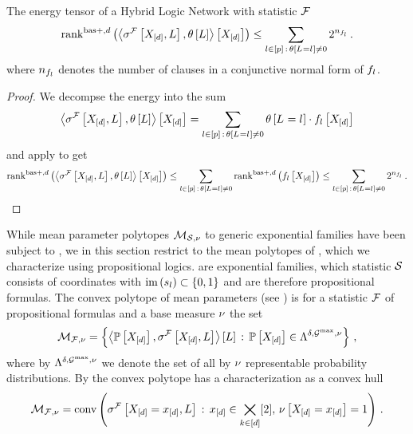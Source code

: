 \begin{corollary}
    The energy tensor of a Hybrid Logic Network with statistic $\mathcal{F}$
    \begin{align*}
        \mathrm{rank}^{\mathrm{bas+},d}\left(\left\langle \sigma^{\mathcal{F}}\left[X_{[d]},L\right],\theta\left[L\right]\right\rangle \left[ X_{[d]} \right]\right) \leq \sum_{l\in[p]\,:\,\theta\left[L_{}=l_{}\right]\neq0} 2^{n_{f_{l}}} \, .
    \end{align*}
    where $n_{f_{l}}$ denotes the number of clauses in a conjunctive normal form of $f_{l}$.
\end{corollary}
\begin{proof}
    We decompse the energy into the sum
    \begin{align*}
        \left\langle \sigma^{\mathcal{F}}\left[X_{[d]},L\right],\theta\left[L\right]\right\rangle \left[ X_{[d]} \right]
        = \sum_{l\in[p]\,:\,\theta\left[L_{}=l_{}\right]\neq0} \theta\left[L_{}=l_{}\right] \cdot f_{l}\left[X_{[d]}\right]
    \end{align*}
    and apply  to get
    \begin{align*}
        \mathrm{rank}^{\mathrm{bas+},d}\left(\left\langle \sigma^{\mathcal{F}}\left[X_{[d]},L\right],\theta\left[L\right]\right\rangle \left[ X_{[d]} \right]\right)
        \leq \sum_{l\in[p]\,:\,\theta\left[L_{}=l_{}\right]\neq0} \mathrm{rank}^{\mathrm{bas+},d}\left(f_{l}\left[X_{[d]}\right]\right)
        \leq \sum_{l\in[p]\,:\,\theta\left[L_{}=l_{}\right]\neq0}2^{n_{f_{l}}} \, .
    \end{align*}
\end{proof}



While mean parameter polytopes $\mathcal{M}_{\mathcal{S},\nu}$ to generic exponential families have been subject to , we in this section restrict to the mean polytopes of \HybridLogicNetworks{}, which we characterize using propositional logics.
\HybridLogicNetworks{} are exponential families, which statistic $\mathcal{S}$ consists of coordinates with $\mathrm{im}\left(s_{l}\right)\subset\{0,1\}$ and are therefore propositional formulas.
The convex polytope of mean parameters (see ) is for a statistic $\mathcal{F}$ of propositional formulas and a base measure $\nu$ the set
\begin{align*}
    \mathcal{M}_{\mathcal{F},\nu} = \left\{ \left\langle \mathbb{P}\left[X_{[d]}\right],\sigma^{\mathcal{F}}\left[X_{[d]},L\right]\right\rangle \left[ L \right] \,:\, \mathbb{P}\left[X_{[d]}\right]\in\Lambda^{\delta,\mathcal{G}^{\mathrm{max}},\nu} \right\} \, ,
\end{align*}
where by $\Lambda^{\delta,\mathcal{G}^{\mathrm{max}},\nu}$ we denote the set of all by $\nu$ representable probability distributions.
By  the convex polytope has a characterization as a convex hull
\begin{align}
    \label{eq:hlnMeansetConvCharacterization}
    \mathcal{M}_{\mathcal{F},\nu}
    = \mathrm{conv}\left(\sigma^{\mathcal{F}}\left[X_{[d]}=x_{[d]},L\right] \,:\, x_{[d]}\in\bigtimes_{k\in[d]}[2], \, \nu\left[X_{[d]}=x_{[d]}\right]=1\right) \, .
\end{align}

